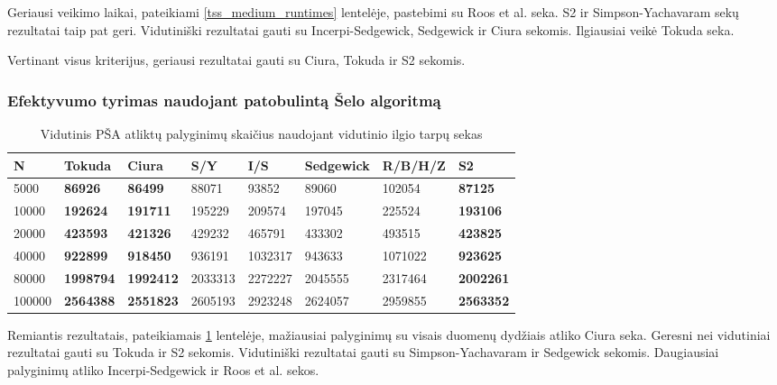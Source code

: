 \documentclass{VUMIFInfKursinis}
\begin{document}
Geriausi veikimo laikai, pateikiami \ref{tss_medium_runtimes} lentelėje, pastebimi su Roos et al. seka.
S2 ir Simpson-Yachavaram sekų rezultatai taip pat geri.
Vidutiniški rezultatai gauti su Incerpi-Sedgewick, Sedgewick ir Ciura sekomis.
Ilgiausiai veikė Tokuda seka.

Vertinant visus kriterijus, geriausi rezultatai gauti su Ciura, Tokuda ir S2 sekomis.

\subsubsection{Efektyvumo tyrimas naudojant patobulintą Šelo algoritmą}

\begin{table}[H]
  \caption{Vidutinis PŠA atliktų palyginimų skaičius naudojant vidutinio ilgio tarpų sekas}
  \label{iss_medium_comparisons}
  \begin{tabular}{|l|l|l|l|l|l|l|l|}
  \hline
  N      & Tokuda           & Ciura            & S/Y     & I/S     & Sedgewick & R/B/H/Z & S2               \\ \hline
  5000   & \textbf{86926}   & \textbf{86499}   & 88071   & 93852   & 89060     & 102054  & \textbf{87125}   \\ \hline
  10000  & \textbf{192624}  & \textbf{191711}  & 195229  & 209574  & 197045    & 225524  & \textbf{193106}  \\ \hline
  20000  & \textbf{423593}  & \textbf{421326}  & 429232  & 465791  & 433302    & 493515  & \textbf{423825}  \\ \hline
  40000  & \textbf{922899}  & \textbf{918450}  & 936191  & 1032317 & 943633    & 1071022 & \textbf{923625}  \\ \hline
  80000  & \textbf{1998794} & \textbf{1992412} & 2033313 & 2272227 & 2045555   & 2317464 & \textbf{2002261} \\ \hline
  100000 & \textbf{2564388} & \textbf{2551823} & 2605193 & 2923248 & 2624057   & 2959855 & \textbf{2563352} \\ \hline
  \end{tabular}
\end{table}

Remiantis rezultatais, pateikiamais \ref{iss_medium_comparisons} lentelėje,
mažiausiai palyginimų su visais duomenų dydžiais atliko Ciura seka.
Geresni nei vidutiniai rezultatai gauti su Tokuda ir S2 sekomis.
Vidutiniški rezultatai gauti su Simpson-Yachavaram ir Sedgewick sekomis.
Daugiausiai palyginimų atliko Incerpi-Sedgewick ir Roos et al. sekos.
\end{document}

